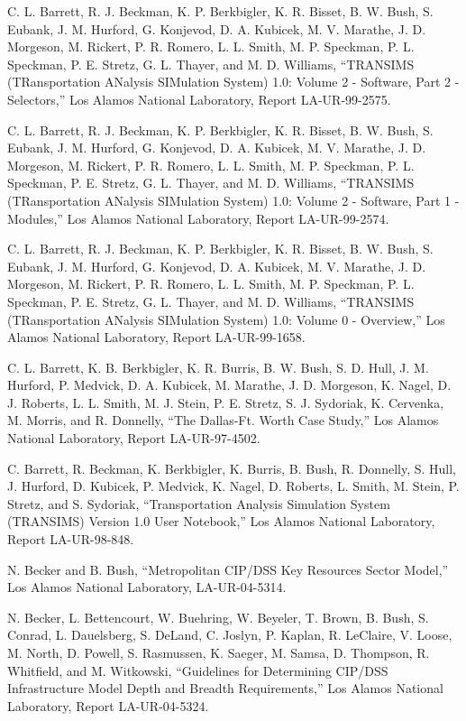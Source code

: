 \documentclass[]{article}
\begin{document}
C. L. Barrett, R. J. Beckman, K. P. Berkbigler, K. R. Bisset, B. W.
Bush, S. Eubank, J. M. Hurford, G. Konjevod, D. A. Kubicek, M. V.
Marathe, J. D. Morgeson, M. Rickert, P. R. Romero, L. L. Smith, M. P.
Speckman, P. L. Speckman, P. E. Stretz, G. L. Thayer, and M. D.
Williams, ``TRANSIMS (TRansportation ANalysis SIMulation System) 1.0:
Volume 2 - Software, Part 2 - Selectors,'' Los Alamos National
Laboratory, Report LA-UR-99-2575.

C. L. Barrett, R. J. Beckman, K. P. Berkbigler, K. R. Bisset, B. W.
Bush, S. Eubank, J. M. Hurford, G. Konjevod, D. A. Kubicek, M. V.
Marathe, J. D. Morgeson, M. Rickert, P. R. Romero, L. L. Smith, M. P.
Speckman, P. L. Speckman, P. E. Stretz, G. L. Thayer, and M. D.
Williams, ``TRANSIMS (TRansportation ANalysis SIMulation System) 1.0:
Volume 2 - Software, Part 1 - Modules,'' Los Alamos National Laboratory,
Report LA-UR-99-2574.

C. L. Barrett, R. J. Beckman, K. P. Berkbigler, K. R. Bisset, B. W.
Bush, S. Eubank, J. M. Hurford, G. Konjevod, D. A. Kubicek, M. V.
Marathe, J. D. Morgeson, M. Rickert, P. R. Romero, L. L. Smith, M. P.
Speckman, P. L. Speckman, P. E. Stretz, G. L. Thayer, and M. D.
Williams, ``TRANSIMS (TRansportation ANalysis SIMulation System) 1.0:
Volume 0 - Overview,'' Los Alamos National Laboratory, Report
LA-UR-99-1658.

C. L. Barrett, K. B. Berkbigler, K. R. Burris, B. W. Bush, S. D. Hull,
J. M. Hurford, P. Medvick, D. A. Kubicek, M. Marathe, J. D. Morgeson, K.
Nagel, D. J. Roberts, L. L. Smith, M. J. Stein, P. E. Stretz, S. J.
Sydoriak, K. Cervenka, M. Morris, and R. Donnelly, ``The Dallas-Ft.
Worth Case Study,'' Los Alamos National Laboratory, Report
LA-UR-97-4502.

C. Barrett, R. Beckman, K. Berkbigler, K. Burris, B. Bush, R. Donnelly,
S. Hull, J. Hurford, D. Kubicek, P. Medvick, K. Nagel, D. Roberts, L.
Smith, M. Stein, P. Stretz, and S. Sydoriak, ``Transportation Analysis
Simulation System (TRANSIMS) Version 1.0 User Notebook,'' Los Alamos
National Laboratory, Report LA-UR-98-848.

N. Becker and B. Bush, ``Metropolitan CIP/DSS Key Resources Sector
Model,'' Los Alamos National Laboratory, LA-UR-04-5314.

N. Becker, L. Bettencourt, W. Buehring, W. Beyeler, T. Brown, B. Bush,
S. Conrad, L. Dauelsberg, S. DeLand, C. Joslyn, P. Kaplan, R. LeClaire,
V. Loose, M. North, D. Powell, S. Rasmussen, K. Saeger, M. Samsa, D.
Thompson, R. Whitfield, and M. Witkowski, ``Guidelines for Determining
CIP/DSS Infrastructure Model Depth and Breadth Requirements,'' Los
Alamos National Laboratory, Report LA-UR-04-5324.
\end{document}
